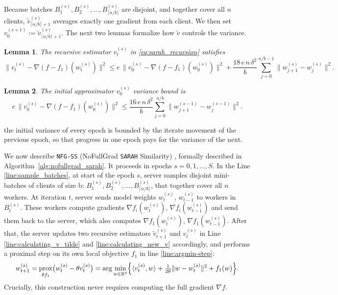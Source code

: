\documentclass{article}
\DeclareMathOperator{\prox}{prox}
\newtheorem{lemma}{Lemma}
\begin{document}
Because batches $B^{(s)}_1, B^{(s)}_2, \ldots, B^{(s)}_{\lceil n/b \rceil}$ are disjoint, and together cover all $n$ clients, $\tilde v^{(s)}_{\lceil n/b \rceil + 1}$ averages exactly one gradient from each client. We then set $v_0^{(s+1)} := \tilde v_{\lceil n/b \rceil + 1}^{(s)}$. The next two lemmas formalize how $\tilde v$ controls the variance. 

\begin{lemma}%
\label{lem:deviation_gradient}
The recursive estimator $v_t^{(s)}$ in \ref{eq:sarah_recursion} 
satisfies
\[ 
    \|v_t^{(s)} - \nabla(f - f_1)(w_t^{(s)})\|^2 
    \leq e\,\|v_0^{(s)} - \nabla(f - f_1)(w_0^{(s)})\|^2 
    + \frac{18\,e\,n\,\delta^2}{b}\sum_{j=0}^{n/b - 1}
    \|w_{j+1}^{(s)} - w_j^{(s)}\|^2.
\]
\end{lemma}

\begin{lemma}%
\label{lem:initial_deviation_gradient}
The initial approximator $v_0^{(s)}$ variance bound is
\[ 
    e\,\|v_0^{(s)} - \nabla(f - f_1)(w_0^{(s)})\|^2 
    \leq \frac{16\,e\,n\,\delta^2}{b}\sum_{j=0}^{n/b}
    \|w_{j+1}^{(s-1)} - w_j^{(s-1)}\|^2.
\]
\end{lemma}

the initial variance of every epoch is bounded by the iterate movement of 
the previous epoch, so that progress in one epoch pays for the 
variance of the next.




We now describe \texttt{NFG-SS} (NoFullGrad \texttt{SARAH} Similarity) , formally described in Algorithm~\ref{alg:nofullgrad_sarah}. It proceeds in epochs $s=0, 1, \ldots, S$. In the Line \ref{line:sample_batches}, at start of the epoch $s$, server samples disjoint mini-batches of clients of size b: $B^{(s)}_1, B^{(s)}_2, \ldots, B^{(s)}_{\lceil n/b \rceil}$, that together cover all $n$ workers. At iteration $t$, server sends model weights $w^{(s)}_t$, $w^{(s)}_{t-1}$ to workers in $B^{(s)}_t$. These workers compute gradients $\nabla f_i(w^{(s)}_t)$, $\nabla f_i(w^{(s)}_{t-1})$ and send them back to the server, which also computes $\nabla f_1(w^{(s)}_t)$, $\nabla f_1(w^{(s)}_{t-1})$. After that, the server updates two recursive 
estimators $\tilde v_{t+1}^{(s)}$ and $v_t^{(s)}$ in Line \ref{line:calculating_v_tilde} and \ref{line:calculating_new_v} accordingly, and performs a 
proximal step on its own local objective $f_1$ in line \ref{line:argmin-step}:
\begin{equation}
    w_{t+1}^{(s)} = \prox_{\theta f_1}\bigl(w_t^{(s)} - \theta v_t^{(s)}\bigr) 
    = \arg\min_{w \in \mathbb{R}^d} \Bigl\{\langle v_t^{(s)}, w \rangle 
    + \tfrac{1}{2\theta}\|w - w_t^{(s)}\|^2 + f_1(w)\Bigr\}.
\end{equation}
Crucially, this construction never requires 
computing the full gradient $\nabla f$.
\end{document}
